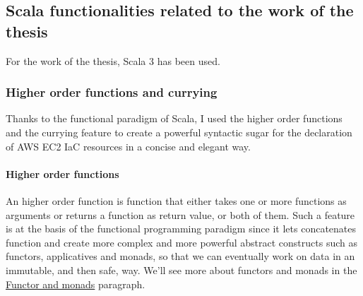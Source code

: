 \subsection{Scala functionalities related to the work of the thesis}
For the work of the thesis, Scala 3 has been used.

\subsubsection{Higher order functions and currying}
Thanks to the functional paradigm of Scala, I used the higher order functions and the currying feature to create a powerful syntactic sugar for the declaration of AWS \gls{EC2} IaC resources in a 
concise and elegant way.
\paragraph{Higher order functions}
An higher order function is function that either takes one or more functions as arguments or returns a function as return value, or both of them.
Such a feature is at the basis of the functional programming paradigm since it lets concatenates function and create more complex and more powerful abstract constructs such as functors, applicatives and monads, so that we can eventually work on data in an immutable, and then safe, way.
We'll see more about functors and monads in the \hyperref[sssec:functors-monads]{Functor and monads} paragraph.
